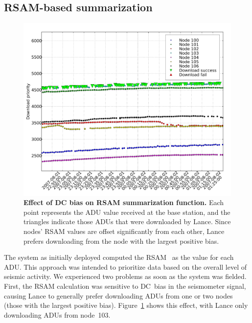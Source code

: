 
\pagebreak
\subsection{RSAM-based summarization}

\begin{figure}[t]
\label{lance-fig-rsam-dc-bias}
\begin{center}
\includegraphics[width=1.0\hsize]{./6-lance/figs/deploy/downloads-pre-median-filter5.pdf}
\end{center}
\caption{\textbf{Effect of DC bias on RSAM summarization function.}
Each point represents the ADU value received at the base station, and the
triangles indicate those ADUs that were downloaded by Lance. Since nodes'
RSAM values are offset significantly from each other, Lance prefers
downloading from the node with the largest positive bias.}
\end{figure}

The system as initially deployed computed the RSAM~\cite{rsam} as the
value for each ADU.
This approach was intended to prioritize data based on
the overall level of seismic activity. We experienced two problems as
soon as the system was fielded. First, the RSAM calculation was
sensitive to DC~bias in the seismometer signal, causing Lance to 
generally prefer downloading ADUs from one or two nodes (those with
the largest positive bias). Figure~\ref{lance-fig-rsam-dc-bias} shows this
effect, with Lance only downloading ADUs from node~103.


